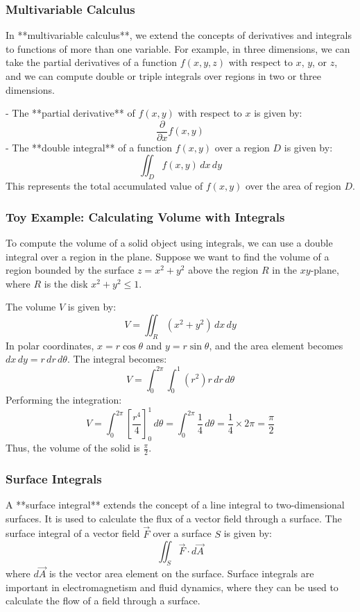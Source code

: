 \documentclass{article}
\begin{document}
\subsubsection*{Multivariable Calculus}

In **multivariable calculus**, we extend the concepts of derivatives and integrals to functions of more than one variable. For example, in three dimensions, we can take the partial derivatives of a function \( f(x, y, z) \) with respect to \( x \), \( y \), or \( z \), and we can compute double or triple integrals over regions in two or three dimensions.

- The **partial derivative** of \( f(x, y) \) with respect to \( x \) is given by:
  \[
  \frac{\partial}{\partial x} f(x, y)
  \]
- The **double integral** of a function \( f(x, y) \) over a region \( D \) is given by:
  \[
  \iint_D f(x, y) \, dx \, dy
  \]
  This represents the total accumulated value of \( f(x, y) \) over the area of region \( D \).

\subsubsection*{Toy Example: Calculating Volume with Integrals}

To compute the volume of a solid object using integrals, we can use a double integral over a region in the plane. Suppose we want to find the volume of a region bounded by the surface \( z = x^2 + y^2 \) above the region \( R \) in the \( xy \)-plane, where \( R \) is the disk \( x^2 + y^2 \leq 1 \).

The volume \( V \) is given by:
\[
V = \iint_R (x^2 + y^2) \, dx \, dy
\]
In polar coordinates, \( x = r \cos \theta \) and \( y = r \sin \theta \), and the area element becomes \( dx \, dy = r \, dr \, d\theta \). The integral becomes:
\[
V = \int_0^{2\pi} \int_0^1 (r^2) r \, dr \, d\theta
\]
Performing the integration:
\[
V = \int_0^{2\pi} \left[ \frac{r^4}{4} \right]_0^1 \, d\theta = \int_0^{2\pi} \frac{1}{4} \, d\theta = \frac{1}{4} \times 2\pi = \frac{\pi}{2}
\]
Thus, the volume of the solid is \( \frac{\pi}{2} \).

\subsubsection*{Surface Integrals}

A **surface integral** extends the concept of a line integral to two-dimensional surfaces. It is used to calculate the flux of a vector field through a surface. The surface integral of a vector field \( \vec{F} \) over a surface \( S \) is given by:
\[
\iint_S \vec{F} \cdot d\vec{A}
\]
where \( d\vec{A} \) is the vector area element on the surface. Surface integrals are important in electromagnetism and fluid dynamics, where they can be used to calculate the flow of a field through a surface.
\end{document}
